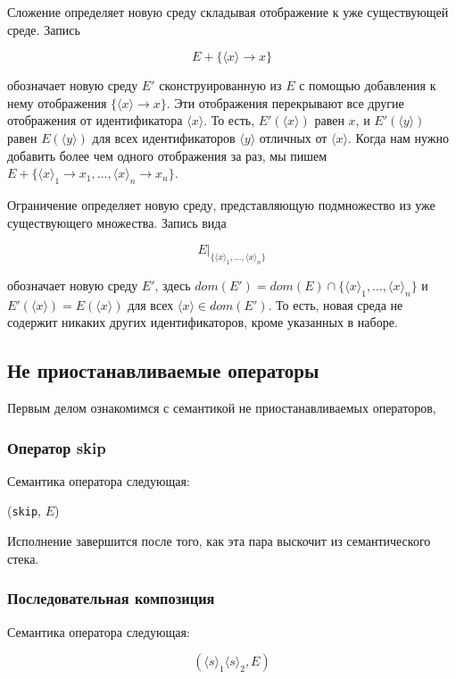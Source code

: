 Сложение определяет новую среду складывая отображение к уже существующей среде. Запись

$$E + \{ \langle x \rangle \to  x \}$$

обозначает новую среду $E'$ сконструированную из $E$ с помощью добавления к нему отображения $\{ \langle x \rangle \to x \}$. Эти отображения перекрывают все другие отображения от идентификатора $\langle x \rangle$. То есть, $E'( \langle x \rangle)$ равен $x$, и $E'( \langle y \rangle)$ равен $E( \langle y \rangle)$ для всех идентификаторов $\langle y \rangle$ отличных от $\langle x \rangle$. Когда нам нужно добавить более чем одного отображения за раз, мы пишем $E+ \{ {\langle x \rangle}_{1} \to {x}_{1}, ..., {\langle x \rangle}_{n} \to {x}_{n}\}$.

Ограничение определяет новую среду, представляющую подмножество из уже существующего множества. Запись вида

$$E|_{ \{ {\langle x \rangle}_{1} ,..., { \langle x \rangle}_{n} \}}$$

обозначает новую среду $E'$, здесь $dom(E') = dom(E) \cap  \{ { \langle x \rangle }_{1} , ..., {\langle x \rangle}_{n} \}$ и $E'(\langle x \rangle) = E(\langle x \rangle)$ для всех $\langle x \rangle \in  dom(E')$. То есть, новая среда не содержит никаких других идентификаторов, кроме указанных в наборе.

\subsection{Не приостанавливаемые операторы}

Первым делом ознакомимся с семантикой не приостанавливаемых операторов,

\subsubsection{Оператор skip}

Семантика оператора следующая:

(\lstinline|skip|, $E$)

Исполнение завершится после того, как эта пара выскочит из семантического стека.

\subsubsection{Последовательная композиция}

Семантика оператора следующая:

$$( {\langle s \rangle}_{1} {\langle s \rangle}_{2}, E)$$

